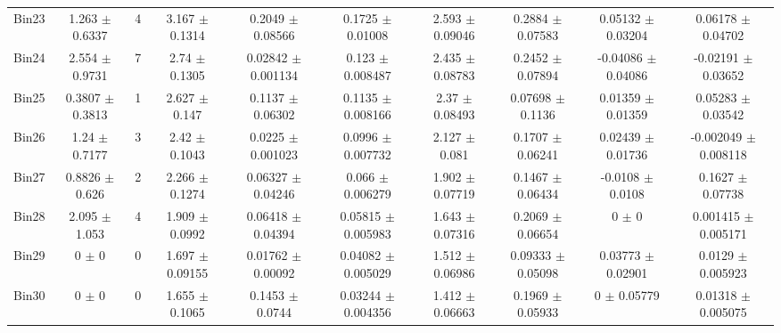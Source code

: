 \begin{tabular}{@{\extracolsep{4pt}}lccccccccc@{}}
     Bin23 & 1.263 $\pm$ 0.6337 & 4 & 3.167 $\pm$ 0.1314 & 0.2049 $\pm$ 0.08566 & 0.1725 $\pm$ 0.01008 & 2.593 $\pm$ 0.09046 & 0.2884 $\pm$ 0.07583 & 0.05132 $\pm$ 0.03204 & 0.06178 $\pm$ 0.04702 \\ 
     Bin24 & 2.554 $\pm$ 0.9731 & 7 & 2.74 $\pm$ 0.1305 & 0.02842 $\pm$ 0.001134 & 0.123 $\pm$ 0.008487 & 2.435 $\pm$ 0.08783 & 0.2452 $\pm$ 0.07894 & -0.04086 $\pm$ 0.04086 & -0.02191 $\pm$ 0.03652 \\ 
     Bin25 & 0.3807 $\pm$ 0.3813 & 1 & 2.627 $\pm$ 0.147 & 0.1137 $\pm$ 0.06302 & 0.1135 $\pm$ 0.008166 & 2.37 $\pm$ 0.08493 & 0.07698 $\pm$ 0.1136 & 0.01359 $\pm$ 0.01359 & 0.05283 $\pm$ 0.03542 \\ 
     Bin26 & 1.24 $\pm$ 0.7177 & 3 & 2.42 $\pm$ 0.1043 & 0.0225 $\pm$ 0.001023 & 0.0996 $\pm$ 0.007732 & 2.127 $\pm$ 0.081 & 0.1707 $\pm$ 0.06241 & 0.02439 $\pm$ 0.01736 & -0.002049 $\pm$ 0.008118 \\ 
     Bin27 & 0.8826 $\pm$ 0.626 & 2 & 2.266 $\pm$ 0.1274 & 0.06327 $\pm$ 0.04246 & 0.066 $\pm$ 0.006279 & 1.902 $\pm$ 0.07719 & 0.1467 $\pm$ 0.06434 & -0.0108 $\pm$ 0.0108 & 0.1627 $\pm$ 0.07738 \\ 
     Bin28 & 2.095 $\pm$ 1.053 & 4 & 1.909 $\pm$ 0.0992 & 0.06418 $\pm$ 0.04394 & 0.05815 $\pm$ 0.005983 & 1.643 $\pm$ 0.07316 & 0.2069 $\pm$ 0.06654 & 0 $\pm$ 0 & 0.001415 $\pm$ 0.005171 \\ 
     Bin29 & 0 $\pm$ 0 & 0 & 1.697 $\pm$ 0.09155 & 0.01762 $\pm$ 0.00092 & 0.04082 $\pm$ 0.005029 & 1.512 $\pm$ 0.06986 & 0.09333 $\pm$ 0.05098 & 0.03773 $\pm$ 0.02901 & 0.0129 $\pm$ 0.005923 \\ 
     Bin30 & 0 $\pm$ 0 & 0 & 1.655 $\pm$ 0.1065 & 0.1453 $\pm$ 0.0744 & 0.03244 $\pm$ 0.004356 & 1.412 $\pm$ 0.06663 & 0.1969 $\pm$ 0.05933 & 0 $\pm$ 0.05779 & 0.01318 $\pm$ 0.005075 \\ 
\hline\hline
  \end{tabular}
